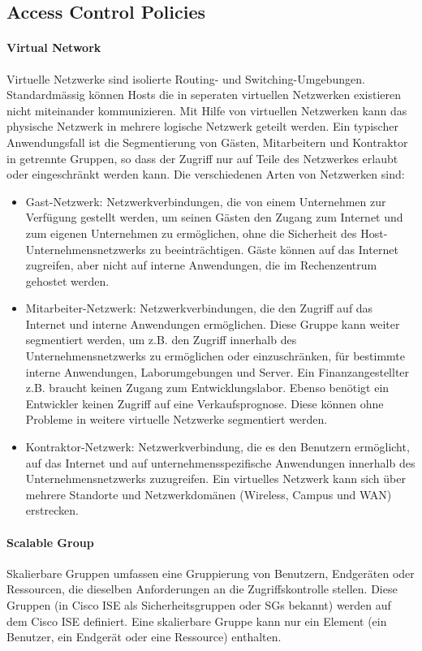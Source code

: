 \subsection{Access Control Policies}

\paragraph{Virtual Network}
Virtuelle Netzwerke sind isolierte Routing- und Switching-Umgebungen. Standardmässig können Hosts die in seperaten virtuellen Netzwerken existieren nicht miteinander kommunizieren. Mit Hilfe von virtuellen Netzwerken kann das physische Netzwerk in mehrere logische Netzwerk geteilt werden. Ein typischer Anwendungsfall ist die Segmentierung von Gästen, Mitarbeitern und Kontraktor in getrennte Gruppen, so dass der Zugriff nur auf Teile des Netzwerkes erlaubt oder eingeschränkt werden kann. Die verschiedenen Arten von Netzwerken sind:

\begin{itemize}
	\item Gast-Netzwerk: Netzwerkverbindungen, die von einem Unternehmen zur Verfügung gestellt werden, um seinen Gästen den Zugang zum Internet und zum eigenen Unternehmen zu ermöglichen, ohne die Sicherheit des Host-Unternehmensnetzwerks zu beeinträchtigen. Gäste können auf das Internet zugreifen, aber nicht auf interne Anwendungen, die im Rechenzentrum gehostet werden.
	\item Mitarbeiter-Netzwerk: Netzwerkverbindungen, die den Zugriff auf das Internet und interne Anwendungen ermöglichen. Diese Gruppe kann weiter segmentiert werden, um z.B. den Zugriff innerhalb des Unternehmensnetzwerks zu ermöglichen oder einzuschränken, für bestimmte interne Anwendungen, Laborumgebungen und Server. Ein Finanzangestellter z.B. braucht keinen Zugang zum Entwicklungslabor. Ebenso benötigt ein Entwickler keinen Zugriff auf eine Verkaufsprognose. Diese können ohne Probleme in weitere virtuelle Netzwerke segmentiert werden.
	\item Kontraktor-Netzwerk: Netzwerkverbindung, die es den Benutzern ermöglicht, auf das Internet und auf unternehmensspezifische Anwendungen innerhalb des Unternehmensnetzwerks zuzugreifen. Ein virtuelles Netzwerk kann sich über mehrere Standorte und Netzwerkdomänen (Wireless, Campus und WAN) erstrecken.
\end{itemize}


\paragraph{Scalable Group}
Skalierbare Gruppen umfassen eine Gruppierung von Benutzern, Endgeräten oder Ressourcen, die dieselben Anforderungen an die Zugriffskontrolle stellen. Diese Gruppen (in Cisco ISE als Sicherheitsgruppen oder SGs bekannt) werden auf dem Cisco ISE definiert. Eine skalierbare Gruppe kann nur ein Element (ein Benutzer, ein Endgerät oder eine Ressource) enthalten.

